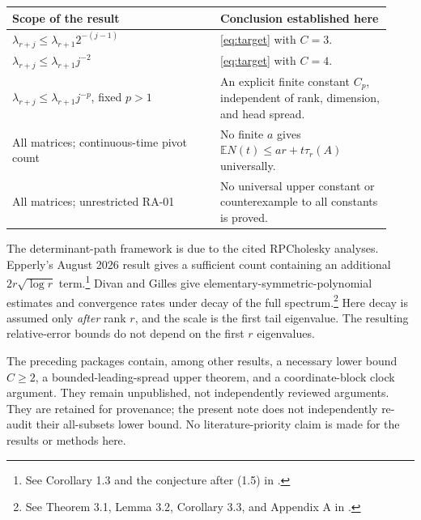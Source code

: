\documentclass[11pt]{article}
\theoremstyle{remark}\newtheorem{remark}[theorem]{Remark}
\newcommand{\E}{\mathbb E}
\begin{document}
\begin{center}
\begin{tabular}{@{}p{0.51\linewidth}p{0.42\linewidth}@{}}
\toprule
Scope of the result & Conclusion established here\\
\midrule
$\lambda_{r+j}\le\lambda_{r+1}2^{-(j-1)}$ & \eqref{eq:target} with $C=3$.\\[3pt]
$\lambda_{r+j}\le\lambda_{r+1}j^{-2}$ & \eqref{eq:target} with $C=4$.\\[3pt]
$\lambda_{r+j}\le\lambda_{r+1}j^{-p}$, fixed $p>1$ & An explicit finite constant $C_p$, independent of rank, dimension, and head spread.\\[3pt]
All matrices; continuous-time pivot count & No finite $a$ gives $\E N(t)\le ar+t\tau_r(A)$ universally.\\[3pt]
All matrices; unrestricted RA-01 & No universal upper constant or counterexample to all constants is proved.\\
\bottomrule
\end{tabular}
\end{center}

The determinant-path framework is due to the cited RPCholesky analyses. Epperly's August 2026 result gives a sufficient count containing an additional $2r\sqrt{\log r}$ term.\footnote{See Corollary 1.3 and the conjecture after (1.5) in \cite{epperly}.} Divan and Gilles give elementary-symmetric-polynomial estimates and convergence rates under decay of the full spectrum.\footnote{See Theorem 3.1, Lemma 3.2, Corollary 3.3, and Appendix A in \cite{divan}.} Here decay is assumed only \emph{after} rank $r$, and the scale is the first tail eigenvalue. The resulting relative-error bounds do not depend on the first $r$ eigenvalues.

The preceding packages contain, among other results, a necessary lower bound $C\ge2$, a bounded-leading-spread upper theorem, and a coordinate-block clock argument. They remain unpublished, not independently reviewed arguments. They are retained for provenance; the present note does not independently re-audit their all-subsets lower bound. No literature-priority claim is made for the results or methods here.
\end{document}
